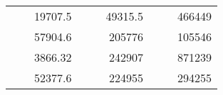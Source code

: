 \begin{table}[H]
\begin{tabular}{|ccrccrccc}
\rowcolor[HTML]{DDFDFF} 
\multicolumn{1}{|c|}{\cellcolor[HTML]{FFFFC7}}                                & \multicolumn{1}{c|}{\cellcolor[HTML]{DDFDFF}}                      & \multicolumn{1}{r|}{\cellcolor[HTML]{DAE8FC}19707.5}   & \multicolumn{1}{c|}{\cellcolor[HTML]{FFFFC7}}                                & \multicolumn{1}{c|}{\cellcolor[HTML]{DDFDFF}}                       & \multicolumn{1}{r|}{\cellcolor[HTML]{DDFDFF}49315.5}   & \multicolumn{1}{c|}{\cellcolor[HTML]{FFFFC7}}                                & \multicolumn{1}{c|}{\cellcolor[HTML]{DDFDFF}}                      & \multicolumn{1}{r|}{\cellcolor[HTML]{DDFDFF}466449}    \\ \cline{3-3} \cline{6-6} \cline{9-9} 
\multicolumn{1}{|c|}{\cellcolor[HTML]{FFFFC7}}                                & \multicolumn{1}{c|}{\cellcolor[HTML]{DDFDFF}}                      & \multicolumn{1}{r|}{\cellcolor[HTML]{DDFDFF}57904.6}   & \multicolumn{1}{c|}{\cellcolor[HTML]{FFFFC7}}                                & \multicolumn{1}{c|}{\cellcolor[HTML]{DDFDFF}}                       & \multicolumn{1}{r|}{\cellcolor[HTML]{DAE8FC}205776}    & \multicolumn{1}{c|}{\cellcolor[HTML]{FFFFC7}}                                & \multicolumn{1}{c|}{\cellcolor[HTML]{DDFDFF}}                      & \multicolumn{1}{r|}{\cellcolor[HTML]{DAE8FC}105546}    \\ \cline{3-3} \cline{6-6} \cline{9-9} 
\rowcolor[HTML]{DDFDFF} 
\multicolumn{1}{|c|}{\cellcolor[HTML]{FFFFC7}}                                & \multicolumn{1}{c|}{\cellcolor[HTML]{DDFDFF}}                      & \multicolumn{1}{r|}{\cellcolor[HTML]{DAE8FC}3866.32}   & \multicolumn{1}{c|}{\cellcolor[HTML]{FFFFC7}}                                & \multicolumn{1}{c|}{\cellcolor[HTML]{DDFDFF}}                       & \multicolumn{1}{r|}{\cellcolor[HTML]{DDFDFF}242907}    & \multicolumn{1}{c|}{\cellcolor[HTML]{FFFFC7}}                                & \multicolumn{1}{c|}{\cellcolor[HTML]{DDFDFF}}                      & \multicolumn{1}{r|}{\cellcolor[HTML]{DDFDFF}871239}    \\ \cline{3-3} \cline{6-6} \cline{9-9} 
\multicolumn{1}{|c|}{\cellcolor[HTML]{FFFFC7}}                                & \multicolumn{1}{c|}{\cellcolor[HTML]{DDFDFF}}                      & \multicolumn{1}{r|}{\cellcolor[HTML]{DDFDFF}52377.6}   & \multicolumn{1}{c|}{\cellcolor[HTML]{FFFFC7}}                                & \multicolumn{1}{c|}{\cellcolor[HTML]{DDFDFF}}                       & \multicolumn{1}{r|}{\cellcolor[HTML]{DAE8FC}224955}    & \multicolumn{1}{c|}{\cellcolor[HTML]{FFFFC7}}                                & \multicolumn{1}{c|}{\cellcolor[HTML]{DDFDFF}}                      & \multicolumn{1}{r|}{\cellcolor[HTML]{DAE8FC}294255}    \\ \cline{3-3} \cline{6-6} \cline{9-9} 

\end{tabular}
\end{table}
